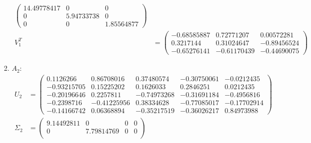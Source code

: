 \documentclass[conference,onecolumn]{IEEEtran}
\begin{document}
\begin{enumerate}[label=\arabic{enumi}.]
\begin{enumerate}
\begin{enumerate}
\begin{align*}
\begin{pmatrix}
                                      14.49778417 & 0          & 0          \\
                                      0           & 5.94733738 & 0          \\
                                      0           & 0          & 1.85564877
                                  \end{pmatrix} \\
                                  V_1^T    & =
                                  \begin{pmatrix}
                                      -0.68585887 & 0.72771207  & 0.00572281  \\
                                      0.3217144   & 0.31024647  & -0.89456524 \\
                                      -0.65276141 & -0.61170439 & -0.44690075
                                  \end{pmatrix}
                              \end{align*}
                        \item $A_2$:
                              \begin{align*}
                                  U_2      & =
                                  \begin{pmatrix}
                                      0.1126266   & 0.86708016  & 0.37480574  & -0.30750061 & -0.0212435  \\
                                      -0.93215705 & 0.15225202  & 0.1626033   & 0.2846251   & 0.0212435   \\
                                      -0.20196646 & 0.2257811   & -0.74973268 & -0.31691184 & -0.4956816  \\
                                      -0.2398716  & -0.41225956 & 0.38334628  & -0.77085017 & -0.17702914 \\
                                      -0.14166742 & 0.06368894  & -0.35217519 & -0.36026217 & 0.84973988
                                  \end{pmatrix} \\
                                  \Sigma_2 & =
                                  \begin{pmatrix}
                                      9.14492811 & 0          & 0          & 0          \\
                                      0          & 7.79814769 & 0          & 0          \\

\end{pmatrix}
\end{align*}
\end{enumerate}
\end{enumerate}
\end{enumerate}
\end{document}
